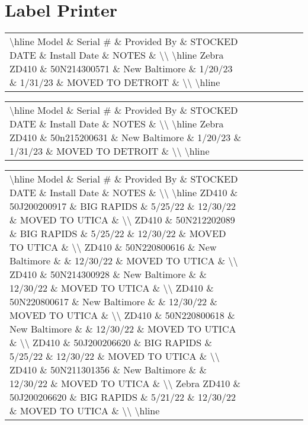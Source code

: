 \documentclass{article}%
\begin{document}
\section{Label Printer}%
\label{sec:LabelPrinter}%
\begin{tabularx}{\textwidth}{|X|X|X|X|X|X|X|}%
\textbackslash{}hline%
Model \& Serial \# \& Provided By \& STOCKED DATE \& Install Date \& NOTES \&  \textbackslash{}\textbackslash{}%
\textbackslash{}hline%
Zebra ZD410 \& 50N214300571 \& New Baltimore \& 1/20/23 \& 1/31/23 \& MOVED TO DETROIT \&  \textbackslash{}\textbackslash{}%
\textbackslash{}hline%
\end{tabularx}%
\begin{tabularx}{\textwidth}{|X|X|X|X|X|X|X|}%
\textbackslash{}hline%
Model \& Serial \# \& Provided By \& STOCKED DATE \& Install Date \& NOTES \&  \textbackslash{}\textbackslash{}%
\textbackslash{}hline%
Zebra ZD410 \& 50n215200631 \& New Baltimore \& 1/20/23 \& 1/31/23 \& MOVED TO DETROIT \&  \textbackslash{}\textbackslash{}%
\textbackslash{}hline%
\end{tabularx}%
\begin{tabularx}{\textwidth}{|X|X|X|X|X|X|X|}%
\textbackslash{}hline%
Model \& Serial \# \& Provided By \& STOCKED DATE \& Install Date \& NOTES \&  \textbackslash{}\textbackslash{}%
\textbackslash{}hline%
ZD410 \& 50J200200917 \& BIG RAPIDS \& 5/25/22 \& 12/30/22 \& MOVED TO UTICA \&  \textbackslash{}\textbackslash{}%
ZD410 \& 50N212202089 \& BIG RAPIDS \& 5/25/22 \& 12/30/22 \& MOVED TO UTICA \&  \textbackslash{}\textbackslash{}%
ZD410 \& 50N220800616 \& New Baltimore \&  \& 12/30/22 \& MOVED TO UTICA \&  \textbackslash{}\textbackslash{}%
ZD410 \& 50N214300928 \& New Baltimore \&  \& 12/30/22 \& MOVED TO UTICA \&  \textbackslash{}\textbackslash{}%
ZD410 \& 50N220800617 \& New Baltimore \&  \& 12/30/22 \& MOVED TO UTICA \&  \textbackslash{}\textbackslash{}%
ZD410 \& 50N220800618 \& New Baltimore \&  \& 12/30/22 \& MOVED TO UTICA \&  \textbackslash{}\textbackslash{}%
ZD410 \& 50J200206620 \& BIG RAPIDS \& 5/25/22 \& 12/30/22 \& MOVED TO UTICA \&  \textbackslash{}\textbackslash{}%
ZD410 \& 50N211301356 \& New Baltimore \&  \& 12/30/22 \& MOVED TO UTICA \&  \textbackslash{}\textbackslash{}%
Zebra ZD410 \& 50J200206620 \& BIG RAPIDS \& 5/21/22 \& 12/30/22 \& MOVED TO UTICA \&  \textbackslash{}\textbackslash{}%
\textbackslash{}hline%
\end{tabularx}

%
\end{document}
